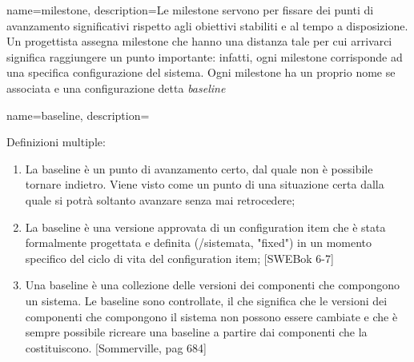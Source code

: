 {
name=milestone,
description={Le milestone servono per fissare dei punti di avanzamento significativi rispetto agli obiettivi stabiliti e al tempo a disposizione.
Un progettista assegna milestone che hanno una distanza tale per cui arrivarci significa raggiungere un punto importante: infatti, ogni milestone corrisponde ad una specifica configurazione del sistema.
Ogni milestone ha un proprio nome se associata e una configurazione detta \textit{baseline}}
}

{
name=baseline,
description={Definizioni multiple:
\begin{enumerate}
\item La baseline \`e un punto di avanzamento certo, dal quale non è possibile tornare indietro. Viene visto come un punto di una situazione certa dalla quale si potr\`a soltanto avanzare senza mai retrocedere;
\item La baseline \`e una versione approvata di un configuration item che \`e stata formalmente progettata e definita (/sistemata, "fixed") in un momento specifico del ciclo di vita del configuration item; [SWEBok 6-7]
\item Una baseline \`e una collezione delle versioni dei componenti che compongono un sistema. Le baseline sono controllate, il che significa che le versioni dei componenti che compongono il sistema non possono essere cambiate e che \`e sempre possibile ricreare una baseline a partire dai componenti che la costituiscono. [Sommerville, pag 684]
\end{enumerate}
}
}



